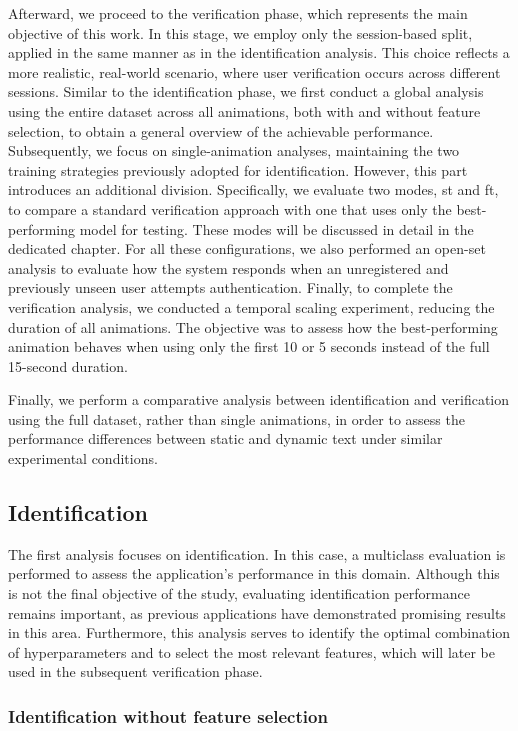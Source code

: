\documentclass{article}
\begin{document}
Afterward, we proceed to the verification phase, which represents the main objective of this work.
In this stage, we employ only the session-based split, applied in the same manner as in the identification analysis.
This choice reflects a more realistic, real-world scenario, where user verification occurs across different sessions.
Similar to the identification phase, we first conduct a global analysis using the entire dataset across all animations, both with and without feature selection, to obtain a general overview of the achievable performance.
Subsequently, we focus on single-animation analyses, maintaining the two training strategies previously adopted for identification.
However, this part introduces an additional division.
Specifically, we evaluate two modes, st and ft, to compare a standard verification approach with one that uses only the best-performing model for testing. 
These modes will be discussed in detail in the dedicated chapter.
For all these configurations, we also performed an open-set analysis to evaluate how the system responds when an unregistered and previously unseen user attempts authentication.
Finally, to complete the verification analysis, we conducted a temporal scaling experiment, reducing the duration of all animations. 
The objective was to assess how the best-performing animation behaves when using only the first 10 or 5 seconds instead of the full 15-second duration.

Finally, we perform a comparative analysis between identification and verification using the full dataset, rather than single animations, in order to assess the performance differences between static and dynamic text under similar experimental conditions.

\subsection{Identification}
The first analysis focuses on identification.
In this case, a multiclass evaluation is performed to assess the application's performance in this domain. 
Although this is not the final objective of the study, evaluating identification performance remains important, as previous applications have demonstrated promising results in this area.
Furthermore, this analysis serves to identify the optimal combination of hyperparameters and to select the most relevant features, which will later be used in the subsequent verification phase.

\subsubsection{Identification without feature selection}
\label{subsec:id_fs_ch}
\end{document}
